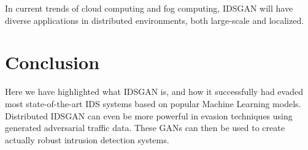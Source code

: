 \documentclass[10pt, conference, compsocconf]{IEEEtran}
\begin{document}
In current trends of cloud computing and fog computing, IDSGAN will have diverse applications in distributed environments, both large-scale and localized.

\section {Conclusion}
Here we have highlighted what IDSGAN is, and how it successfully had evaded most state-of-the-art IDS systems based on popular Machine Learning models. Distributed IDSGAN can even be more powerful in evasion techniques using generated adversarial traffic data. These GANs can then be used to create actually robust intrusion detection systems.



\end{document}
